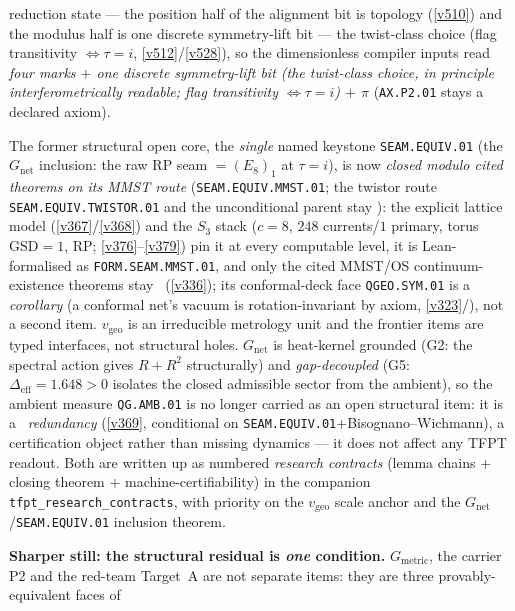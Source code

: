 \documentclass[11pt,a4paper]{article}
\begin{document}
reduction state --- the position half of the alignment bit is topology (\vref{v510}) and the modulus
half is one discrete symmetry-lift bit --- the twist-class choice (flag transitivity
$\iff\tau=i$, \vref{v512}/\vref{v528}), so the
dimensionless compiler inputs read \emph{four marks $+$ one discrete symmetry-lift bit (the
twist-class choice, in principle interferometrically readable; flag
transitivity $\iff\tau=i$) $+$ $\pi$}
(\texttt{AX.P2.01} stays a declared axiom).
\par\smallskip
\noindent The former structural open core, the \emph{single} named keystone \texttt{SEAM.EQUIV.01} (the
$G_{\mathrm{net}}$ inclusion: the raw RP seam $=(E_8)_1$ at $\tau{=}i$), is now \emph{closed modulo cited theorems
on its MMST route} (\texttt{SEAM.EQUIV.MMST.01}; the twistor route \texttt{SEAM.EQUIV.TWISTOR.01} and the
unconditional parent stay \mO):
the explicit lattice model (\vref{v367}/\vref{v368}) and the $S_3$ stack ($c{=}8$, $248$ currents/$1$ primary, torus
$\mathrm{GSD}{=}1$, RP; \vref{v376}--\vref{v379}) pin it at every computable level, it is Lean-formalised as
\texttt{FORM.SEAM.MMST.01}, and only the cited MMST/OS continuum-existence theorems stay \mO\ (\vref{v336}); its
conformal-deck face \texttt{QGEO.SYM.01} is a \emph{corollary} (a conformal net's vacuum is rotation-invariant by axiom,
\vref{v323}/), not a second item. $v_{\mathrm{geo}}$ is an irreducible metrology
unit and the frontier items are typed interfaces, not structural holes. $G_{\mathrm{net}}$ is heat-kernel
grounded (G2: the spectral action gives $R+R^2$ structurally) and \emph{gap-decoupled} (G5:
$\Delta_{\mathrm{eff}}{=}1.648{>}0$ isolates the closed admissible sector from the ambient), so the
ambient measure \texttt{QG.AMB.01} is no longer carried as an open structural item: it is a \mC\ \emph{redundancy}
(\vref{v369}, conditional on \texttt{SEAM.EQUIV.01}${+}$Bisognano--Wichmann), a certification object rather than
missing dynamics --- it does not affect any TFPT readout. Both are written up
as numbered \emph{research contracts} (lemma chains $+$ closing theorem $+$ machine-certifiability) in the
companion \texttt{tfpt\_research\_contracts}, with priority on the $v_{\mathrm{geo}}$ scale anchor and the
$G_{\mathrm{net}}$/\texttt{SEAM.EQUIV.01} inclusion theorem.
\par\smallskip\noindent\textbf{Sharper still: the structural residual is \emph{one} condition.} $G_{\mathrm{metric}}$,
the carrier P2 and the red-team Target~A are not separate items: they are three provably-equivalent faces of
\end{document}
